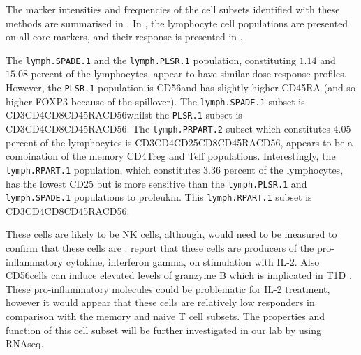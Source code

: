 The marker intensities and frequencies of the cell subsets identified with these methods are summarised in .
In , the lymphocyte cell populations are presented on all core markers, and their response is presented in .

The \texttt{lymph.SPADE.1} and the \texttt{lymph.PLSR.1} population, constituting $1.14$ and $15.08$ percent of the lymphocytes, appear to have similar dose-response profiles.
However, the \texttt{PLSR.1} population is CD56\negative and has slightly higher CD45RA (and so higher FOXP3 because of the spillover).
The \texttt{lymph.SPADE.1} subset is CD3\positive CD4\negative CD8\positive CD45RA\positive CD56\positive whilst the \texttt{PLSR.1} subset is CD3\positive CD4\negative CD8\positive CD45RA\high CD56\negative.
The \texttt{lymph.PRPART.2} subset which constitutes $4.05$ percent of the lymphocytes is CD3\positive CD4\high CD25\high CD8\negative CD45RA\negative CD56\negative, appears to be a combination of the memory CD4\positive Treg and Teff populations.
Interestingly, the \texttt{lymph.RPART.1} population, which constitutes 3.36 percent of the lymphocytes, has the lowest CD25 but is more sensitive than the \texttt{lymph.PLSR.1} and \texttt{lymph.SPADE.1} populations to proleukin.  
This \texttt{lymph.RPART.1} subset is CD3\negative CD4\negative CD8\negative CD45RA\positive CD56\positive.


These cells are likely to be NK cells, although,  would need to be measured to confirm that these cells are \positive.
\citet{Ortaldo:1992tr} report that these \negative {}\positive cells are producers of the pro-inflammatory cytokine, interferon gamma, on stimulation with IL-2.
Also CD56\positive cells can induce elevated levels of granzyme B which is implicated in \gls{T1D} \citep{Thomas:2010cy}.
These pro-inflammatory molecules could be problematic for IL-2 treatment, however it would appear that these cells are relatively low responders in comparison with the memory and naive T cell subsets.
The properties and function of this \negative {}\negative {}\positive {}\positive cell subset will be further investigated in our lab by  using RNAseq.



